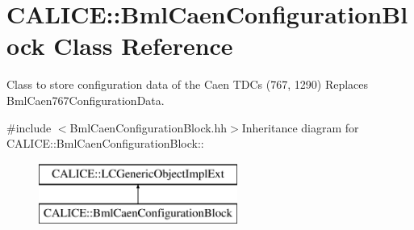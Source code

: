 \section{CALICE::BmlCaenConfigurationBlock Class Reference}
\label{classCALICE_1_1BmlCaenConfigurationBlock}


Class to store configuration data of the Caen TDCs (767, 1290) Replaces BmlCaen767ConfigurationData.  


{\ttfamily \#include $<$BmlCaenConfigurationBlock.hh$>$}Inheritance diagram for CALICE::BmlCaenConfigurationBlock::\begin{figure}[H]
\begin{center}
\leavevmode
\includegraphics[height=2cm]{classCALICE_1_1BmlCaenConfigurationBlock}
\end{center}
\end{figure}
